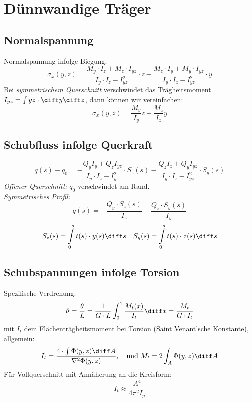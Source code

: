 \section{Dünnwandige Träger} %
	\subsection{Normalspannung} %
		Normalspannung infolge Biegung:
		\begin{equation*}
			\sigma_x(y,z) = \frac{M_y\cdot I_z + M_z \cdot I_{yz}}{I_y\cdot I_z - I_{yz}^2}\cdot z - \frac{M_z \cdot I_y + M_y \cdot I_{yz}}{I_y \cdot I_z - I_{yz}^2}\cdot y
		\end{equation*}
		Bei \emph{symmetrischem Querschnitt} verschwindet das Träg\-heits\-moment $I_{yz}= \int yz \cdot \diff y\diff z$, dann können wir vereinfachen:
		\begin{equation*}
			\sigma_x(y,z) = \frac{M_y}{I_y}z - \frac{M_z}{I_z}y
		\end{equation*}
		\subsection{Schubfluss infolge Querkraft}\label{schubflussquerkraft}
		\begin{equation*}
			q(s) - q_0 = -\frac{Q_y I_y + Q_z I_{yz}}{I_y \cdot I_z - I_{yz}^2}\cdot S_z(s) - \frac{Q_z I_z + Q_y I_{yz}}{I_y \cdot I_z - I_{yz}^2}\cdot S_y(s)
		\end{equation*}
		\emph{Offener Querschnitt:} $q_0$ verschwindet am Rand. \\
		\emph{Symmetrisches Profil:}
		\begin{equation*}
			q(s) = -\frac{Q_y \cdot S_z(s)}{I_z}-\frac{Q_z \cdot S_y(s)}{I_y}
		\end{equation*}
		\begin{equation*}
			S_z(s) = \int\limits_0^s t(s)\cdot y(s) \diff s \quad S_y(s) = \int\limits_0^s t(s)\cdot z(s) \diff s
		\end{equation*}
	\subsection{Schubspannungen infolge Torsion} %
		Spezifische Verdrehung:
		\begin{equation*}
			\vartheta = \frac{\theta}{L}= \frac{1}{G \cdot L} \int_0^1 \frac{M_t(x)}{I_t}\diff x = \frac{M_t}{G \cdot I_t}
		\end{equation*}
		mit $I_t$ dem Flächenträgheitsmoment bei Torsion (Saint Venant'sche Konstante), allgemein:
		\begin{equation*}
			I_t = \frac{4 \cdot \int \Phi(y,z) \diff A}{\nabla^2 \Phi(y,z)}, \quad \text{und } M_t = 2 \int_A \Phi(y,z) \diff A
		\end{equation*}
		Für Vollquerschnitt mit Annäherung an die Kreisform:
		\begin{equation*}
			I_t \approx \frac{A^4}{4\pi^2I_p}
		\end{equation*}
